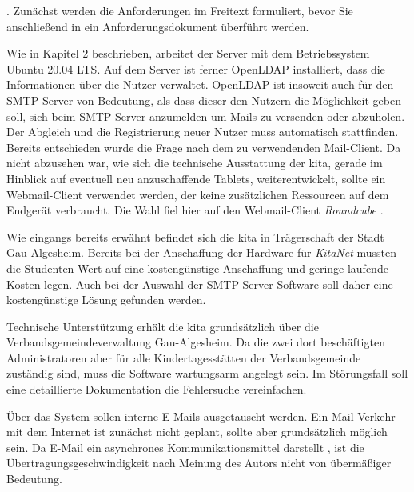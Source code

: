 \citep[][454]{Balzert2010}.
Zunächst werden die Anforderungen im Freitext formuliert, bevor Sie anschließend in ein Anforderungsdokument überführt werden.  

Wie in Kapitel 2 beschrieben, arbeitet der Server mit dem Betriebssystem Ubuntu 20.04 LTS. Auf dem Server ist ferner OpenLDAP installiert, dass die Informationen über die Nutzer verwaltet. OpenLDAP ist insoweit auch für den SMTP-Server von Bedeutung, als dass dieser den Nutzern die Möglichkeit geben soll, sich beim SMTP-Server anzumelden um Mails zu versenden oder abzuholen. Der Abgleich und die Registrierung neuer Nutzer muss automatisch stattfinden.
Bereits entschieden wurde die Frage nach dem zu verwendenden Mail-Client. 
Da nicht abzusehen war, wie sich die technische Ausstattung der \ac{kita}, gerade im Hinblick auf eventuell neu anzuschaffende Tablets, weiterentwickelt, sollte ein Webmail-Client verwendet werden, der keine zusätzlichen Ressourcen auf dem Endgerät verbraucht. Die Wahl fiel hier auf den Webmail-Client \textit{Roundcube} \citep[vgl.][]{roundcubemain}. 

Wie eingangs bereits erwähnt befindet sich die \ac{kita} in Trägerschaft der Stadt Gau-Algesheim. Bereits bei der Anschaffung der Hardware für \textit{KitaNet} mussten die Studenten Wert auf eine kostengünstige Anschaffung und geringe laufende Kosten legen. Auch bei der Auswahl der SMTP-Server-Software soll daher eine kostengünstige Lösung gefunden werden.

Technische Unterstützung erhält die  \ac{kita} grundsätzlich über die Verbandsgemeindeverwaltung Gau-Algesheim. Da die zwei dort beschäftigten Administratoren aber für alle Kindertagesstätten der Verbandsgemeinde zuständig sind, muss die Software wartungsarm angelegt sein. Im Störungsfall soll eine detaillierte Dokumentation die Fehlersuche vereinfachen.

Über das System sollen interne E-Mails ausgetauscht werden. Ein Mail-Verkehr mit dem Internet ist zunächst nicht geplant, sollte aber grundsätzlich möglich sein.
Da E-Mail ein asynchrones Kommunikationsmittel darstellt \citep[vgl.][10]{Duerscheid2003}, ist die Übertragungsgeschwindigkeit nach Meinung des Autors nicht von übermäßiger Bedeutung. 

